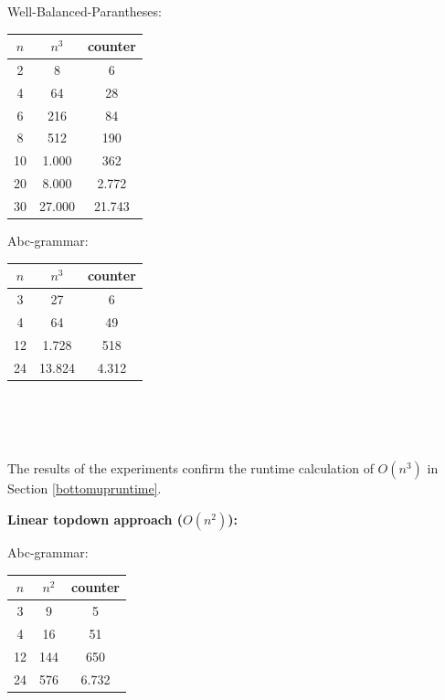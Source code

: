 \documentclass[a4paper, 11pt]{article}
\begin{document}
\begin{minipage}{0.5\textwidth}

Well-Balanced-Parantheses: \\

\begin{tabular}{|c|c|c|}
\hline
$n$ & $n^3$ & counter \\
\hline
2& 8 & 6\\
4& 64 & 28\\
6& 216 & 84\\
8& 512 & 190 \\
10& 1.000 & 362 \\
20& 8.000 & 2.772 \\
30& 27.000 & 21.743\\
\hline
\end{tabular}

\end{minipage}\begin{minipage}{0.5\textwidth}
    
Abc-grammar: \\

\begin{tabular}{|c|c|c|}
\hline
$n$ & $n^3$ & counter \\
\hline
3& 27 & 6\\
4& 64 & 49 \\
12& 1.728 & 518\\
24& 13.824 & 4.312\\
\hline
\end{tabular}   
\ \\ \ \\ \ \\  
\end{minipage}


The results of the experiments confirm the runtime calculation of $O(n^3)$ in Section \ref{bottomupruntime}.



\textbf{Linear topdown approach ($O(n^2)$):} 
    
Abc-grammar: 

\begin{tabular}{|c|c|c|}
\hline
$n$ & $n^2$ & counter \\
\hline
3& 9 & 5\\
4& 16 & 51 \\
12& 144 & 650\\
24& 576 & 6.732\\
\hline
\end{tabular}   
\end{document}
